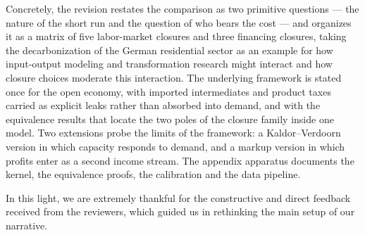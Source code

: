 Concretely, the revision restates the comparison as two primitive questions --- the
nature of the short run and the question of who bears the cost --- and organizes it
as a matrix of five labor-market closures and three financing closures, taking the
decarbonization of the German residential sector as an example for how input-output
modeling and transformation research might interact and how closure choices moderate
this interaction. The underlying framework is stated once for the open economy, with
imported intermediates and product taxes carried as explicit leaks rather than
absorbed into demand, and with the equivalence results that locate the two poles of
the closure family inside one model. Two extensions probe the limits of the
framework: a Kaldor--Verdoorn version in which capacity responds to demand, and a
markup version in which profits enter as a second income stream. The appendix
apparatus documents the kernel, the equivalence proofs, the calibration and the data
pipeline.

In this light, we are extremely thankful for the constructive and direct
feedback received from the reviewers, which guided us in rethinking the main
setup of our narrative.

